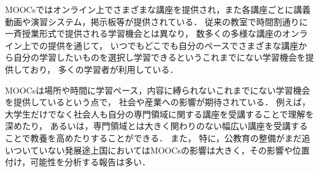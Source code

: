 MOOCsではオンライン上でさまざまな講座を提供され，また各講座ごとに講義動画や演習システム，掲示板等が提供されている．
従来の教室で時間割通りに一斉授業形式で提供される学習機会とは異なり，
数多くの多様な講座のオンライン上での提供を通じて，
いつでもどこでも自分のペースでさまざまな講座から自分の学習したいものを選択し学習できるというこれまでにない学習機会を提供しており，
多くの学習者が利用している．

MOOCsは場所や時間に学習ペース，内容に縛られないこれまでにない学習機会を提供しているという点で，
社会や産業への影響が期待されている．
例えば，大学生だけでなく社会人も自分の専門領域に関する講座を受講することで理解を深めたり，
あるいは，専門領域とは大きく関わりのない幅広い講座を受講することで教養を高めたりすることができる．
また，
特に，公教育の整備がまだ追いついていない発展途上国においてはMOOCsの影響は大きく，その影響や位置付け，可能性を分析する報告は多い\cite{trucano2013more,liyanagunawardena2013impact}．

